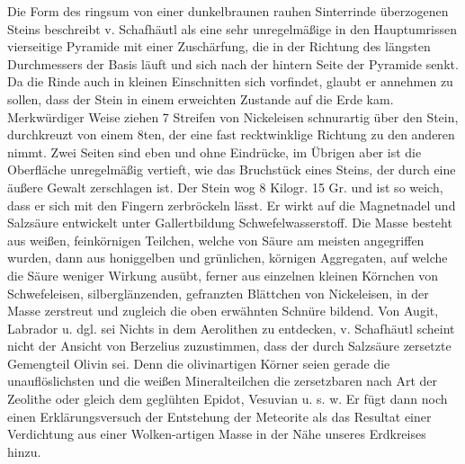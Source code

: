 \documentclass[a4paper, 11pt, oneside]{article}
\begin{document}
Die Form des ringsum von einer dunkelbraunen rauhen Sinterrinde überzogenen Steins beschreibt v. Schafhäutl als eine sehr unregelmäßige in den Hauptumrissen vierseitige Pyramide mit einer Zuschärfung, die in der Richtung des längsten Durchmessers der Basis läuft und sich nach der hintern Seite der Pyramide senkt. Da die Rinde auch in kleinen Einschnitten sich vorfindet, glaubt er annehmen zu sollen, dass der Stein in einem erweichten Zustande auf die Erde kam. Merkwürdiger Weise ziehen 7 Streifen von Nickeleisen schnurartig über den Stein, durchkreuzt von einem 8ten, der eine fast recktwinklige Richtung zu den anderen nimmt. Zwei Seiten sind eben und ohne Eindrücke, im Übrigen aber ist die Oberfläche unregelmäßig vertieft, wie das Bruchstück eines Steins, der durch eine äußere Gewalt zerschlagen ist. Der Stein wog 8 Kilogr. 15 Gr. und ist so weich, dass er sich mit den Fingern zerbröckeln lässt. Er wirkt auf die Magnetnadel und Salzsäure entwickelt unter Gallertbildung Schwefelwasserstoff. Die Masse besteht aus weißen, feinkörnigen Teilchen, welche von Säure am meisten angegriffen wurden, dann aus honiggelben und grünlichen, körnigen Aggregaten, auf welche die Säure weniger Wirkung ausübt, ferner aus einzelnen kleinen Körnchen von Schwefeleisen, silberglänzenden, gefranzten Blättchen von Nickeleisen, in der Masse zerstreut und zugleich die oben erwähnten Schnüre bildend. Von Augit, Labrador u. dgl. sei Nichts in dem Aerolithen zu entdecken, v. Schafhäutl scheint nicht der Ansicht von Berzelius zuzustimmen, dass der durch Salzsäure zersetzte Gemengteil Olivin sei. Denn die olivinartigen Körner seien gerade die unauflöslichsten und die weißen Mineralteilchen die zersetzbaren nach Art der Zeolithe oder gleich dem geglühten Epidot, Vesuvian u. s. w. Er fügt dann noch einen Erklärungsversuch der Entstehung der Meteorite als das Resultat einer Verdichtung aus einer Wolken-artigen Masse in der Nähe unseres Erdkreises hinzu.
\end{document}
